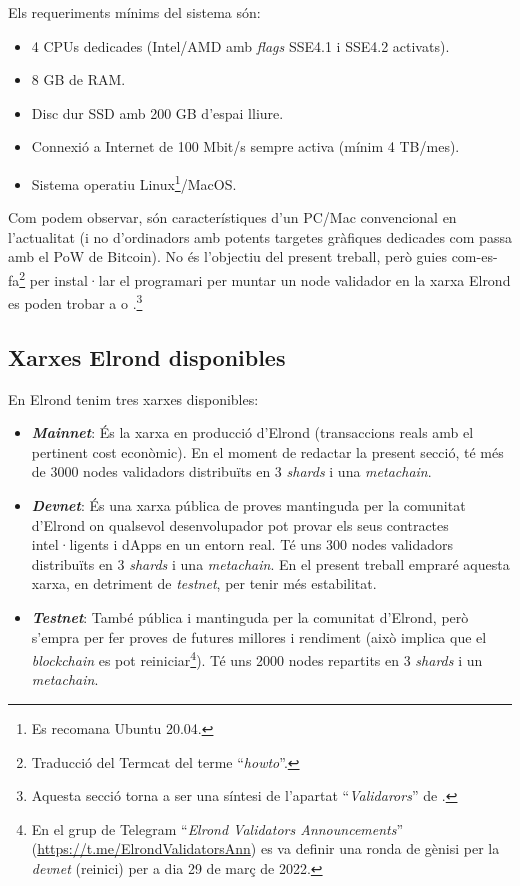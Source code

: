 \documentclass[11pt,a4paper]{article}
\begin{document}
Els requeriments mínims del sistema són:
\begin{itemize}
\item 4 CPUs dedicades (Intel/AMD amb \textit{flags} SSE4.1 i SSE4.2 activats).
\item 8 GB de RAM.
\item Disc dur SSD amb 200 GB d'espai lliure.
\item Connexió a Internet de 100 Mbit/s sempre activa (mínim 4 TB/mes).
\item Sistema operatiu Linux\footnote{Es recomana Ubuntu 20.04.}/MacOS.
\end{itemize}

Com podem observar, són característiques d'un PC/Mac convencional en l'actualitat (i no d'ordinadors amb potents targetes gràfiques dedicades com passa amb el PoW de Bitcoin). No és l'objectiu del present treball, però guies com-es-fa\footnote{Traducció del Termcat del terme ``\textit{howto}''.} per instal·lar el programari per muntar un node validador en la xarxa Elrond es poden trobar a \cite{elrond2022} o \cite{penalver2019}.\footnote{Aquesta secció torna a ser una síntesi de l'apartat ``\textit{Validarors}'' de \cite{elrond2022}.}

\subsection{Xarxes Elrond disponibles}
En Elrond tenim tres xarxes disponibles:
\begin{itemize}
\item \textbf{\textit{Mainnet}}: És la xarxa en producció d'Elrond (transaccions reals amb  el pertinent cost econòmic). En el moment de redactar la present secció, té més de 3000 nodes validadors distribuïts en 3 \textit{shards} i una \textit{metachain}.
\item \textbf{\textit{Devnet}}: És una xarxa pública de proves mantinguda per la comunitat d'Elrond on qualsevol desenvolupador pot provar els seus contractes intel·ligents i dApps en un entorn real. Té uns 300 nodes validadors distribuïts en 3 \textit{shards} i una \textit{metachain}. En el present treball empraré aquesta xarxa, en detriment de \textit{testnet}, per tenir més estabilitat.
\item \textbf{\textit{Testnet}}: També pública i mantinguda per la comunitat d'Elrond, però s'empra per fer proves de futures millores i rendiment \cite{mincub2019-2} (això implica que el \textit{blockchain} es pot reiniciar\footnote{En el grup de Telegram ``\textit{Elrond Validators Announcements}'' (\url{https://t.me/ElrondValidatorsAnn}) es va definir una ronda de gènisi per la \textit{devnet} (reinici) per a dia 29 de març de 2022.}). Té uns 2000 nodes repartits en 3 \textit{shards} i un \textit{metachain}.
\end{itemize}
\end{document}
